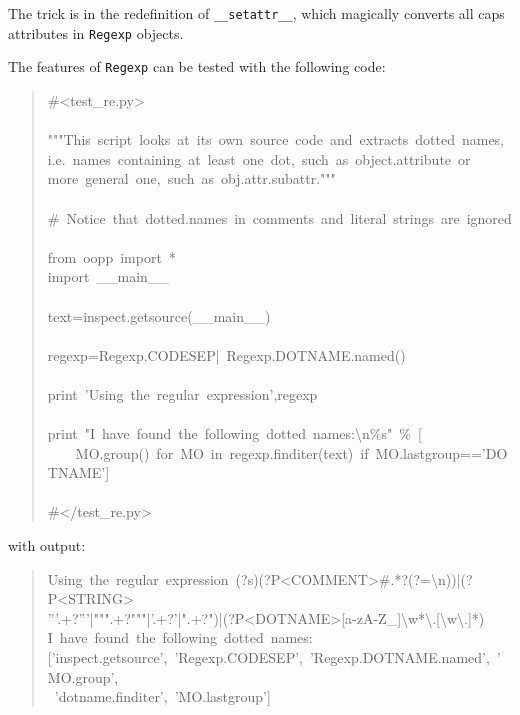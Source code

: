 \documentclass[10pt,english]{article}
\begin{document}
The trick is in the redefinition of \texttt{{\_}{\_}setattr{\_}{\_}}, which magically converts
all caps attributes in \texttt{Regexp} objects.

The features of \texttt{Regexp} can be tested with the following code:
\begin{quote}
\begin{ttfamily}\begin{flushleft}
\mbox{{\#}<test{\_}re.py>}\\
\mbox{}\\
\mbox{"""This~script~looks~at~its~own~source~code~and~extracts~dotted~names,}\\
\mbox{i.e.~names~containing~at~least~one~dot,~such~as~object.attribute~or}\\
\mbox{more~general~one,~such~as~obj.attr.subattr."""}\\
\mbox{}\\
\mbox{{\#}~Notice~that~dotted.names~in~comments~and~literal~strings~are~ignored}\\
\mbox{}\\
\mbox{from~oopp~import~*}\\
\mbox{import~{\_}{\_}main{\_}{\_}}\\
\mbox{}\\
\mbox{text=inspect.getsource({\_}{\_}main{\_}{\_})}\\
\mbox{}\\
\mbox{regexp=Regexp.CODESEP|~Regexp.DOTNAME.named()}\\
\mbox{}\\
\mbox{print~'Using~the~regular~expression',regexp}\\
\mbox{}\\
\mbox{print~"I~have~found~the~following~dotted~names:{\textbackslash}n{\%}s"~{\%}~[}\\
\mbox{~~~~MO.group()~for~MO~in~regexp.finditer(text)~if~MO.lastgroup=='DOTNAME']}\\
\mbox{}\\
\mbox{{\#}</test{\_}re.py>}
\end{flushleft}\end{ttfamily}
\end{quote}

with output:
\begin{quote}
\begin{ttfamily}\begin{flushleft}
\mbox{Using~the~regular~expression~(?s)(?P<COMMENT>{\#}.*?(?={\textbackslash}n))|(?P<STRING>}\\
\mbox{'''.+?'''|""".+?"""|'.+?'|".+?")|(?P<DOTNAME>[a-zA-Z{\_}]{\textbackslash}w*{\textbackslash}.[{\textbackslash}w{\textbackslash}.]*)}\\
\mbox{I~have~found~the~following~dotted~names:}\\
\mbox{['inspect.getsource',~'Regexp.CODESEP',~'Regexp.DOTNAME.named',~'MO.group',~}\\
\mbox{~'dotname.finditer',~'MO.lastgroup']}
\end{flushleft}\end{ttfamily}
\end{quote}
\end{document}

